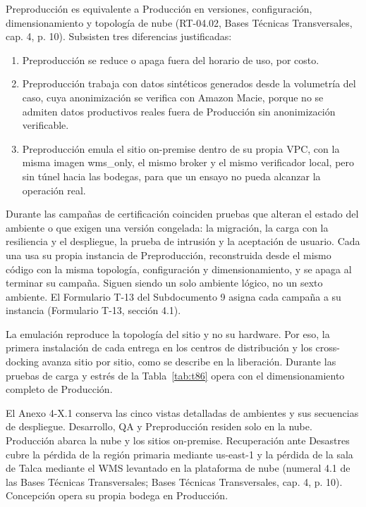 Preproducción es equivalente a Producción en versiones, configuración, dimensionamiento y topología de nube (RT-04.02, Bases Técnicas Transversales, cap. 4, p. 10). Subsisten tres diferencias justificadas:

\begin{enumerate}
  \item Preproducción se reduce o apaga fuera del horario de uso, por costo.
  \item Preproducción trabaja con datos sintéticos generados desde la volumetría del caso, cuya anonimización se verifica con Amazon Macie, porque no se admiten datos productivos reales fuera de Producción sin anonimización verificable.
  \item Preproducción emula el sitio on-premise dentro de su propia VPC, con la misma imagen wms\_only, el mismo broker y el mismo verificador local, pero sin túnel hacia las bodegas, para que un ensayo no pueda alcanzar la operación real.
\end{enumerate}

Durante las campañas de certificación coinciden pruebas que alteran el estado del ambiente o que exigen una versión congelada: la migración, la carga con la resiliencia y el despliegue, la prueba de intrusión y la aceptación de usuario. Cada una usa su propia instancia de Preproducción, reconstruida desde el mismo código con la misma topología, configuración y dimensionamiento, y se apaga al terminar su campaña. Siguen siendo un solo ambiente lógico, no un sexto ambiente. El Formulario T-13 del Subdocumento 9 asigna cada campaña a su instancia (Formulario T-13, sección 4.1).

La emulación reproduce la topología del sitio y no su hardware. Por eso, la primera instalación de cada entrega en los centros de distribución y los cross-docking avanza sitio por sitio, como se describe en la liberación. Durante las pruebas de carga y estrés de la Tabla~\ref{tab:t86} opera con el dimensionamiento completo de Producción.

El Anexo 4-X.1 conserva las cinco vistas detalladas de ambientes y sus secuencias de despliegue. Desarrollo, QA y Preproducción residen solo en la nube. Producción abarca la nube y los sitios on-premise. Recuperación ante Desastres cubre la pérdida de la región primaria mediante us-east-1 y la pérdida de la sala de Talca mediante el WMS levantado en la plataforma de nube (numeral 4.1 de las Bases Técnicas Transversales; Bases Técnicas Transversales, cap. 4, p. 10). Concepción opera su propia bodega en Producción.

